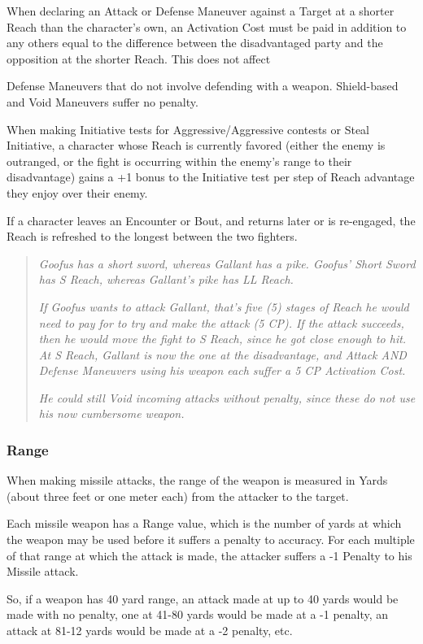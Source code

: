 \documentclass[oneside,11pt,english]{book}
\begin{document}
When declaring an Attack or Defense Maneuver against a Target at a shorter Reach than the character’s own, an Activation Cost must be paid in addition to any others equal to the difference between the disadvantaged party and the opposition at the shorter Reach. This does not affect

Defense Maneuvers that do not involve defending with a weapon. Shield-based and Void Maneuvers suffer no penalty.

When making Initiative tests for Aggressive/Aggressive contests or Steal Initiative, a character whose Reach is currently favored (either the enemy is outranged, or the fight is occurring within the enemy’s range to their disadvantage) gains a +1 bonus to the Initiative test per step of Reach advantage they enjoy over their enemy.

If a character leaves an Encounter or Bout, and returns later or is re-engaged, the Reach is refreshed to the longest between the two fighters.
	\begin{quotation}
		\emph{Goofus has a short sword, whereas Gallant has a pike. Goofus’ Short Sword has S Reach, whereas Gallant’s pike has LL Reach.}

		\emph{If Goofus wants to attack Gallant, that’s five (5) stages of Reach he would need to pay for to try and make the attack (5 CP). If the attack succeeds, then he would move the fight to S Reach, since he got close enough to hit.
		At S Reach, Gallant is now the one at the disadvantage, and Attack AND Defense Maneuvers using his weapon each suffer a 5 CP Activation Cost.}

		\emph{He could still Void incoming attacks without penalty, since these do not use his now cumbersome weapon.}
	\end{quotation}
\subsubsection{Range}
When making missile attacks, the range of the weapon is measured in Yards (about three feet or one meter each) from the attacker to the target. 

Each missile weapon has a Range value, which is the number of yards at which the weapon may be used before it suffers a penalty to accuracy. For each multiple of that range at which the attack is made, the attacker suffers a -1 Penalty to his Missile attack.

So, if a weapon has 40 yard range, an attack made at up to 40 yards would be made with no penalty, one at 41-80 yards would be made at a -1 penalty, an attack at 81-12 yards would be made at a -2 penalty, etc.
\end{document}
